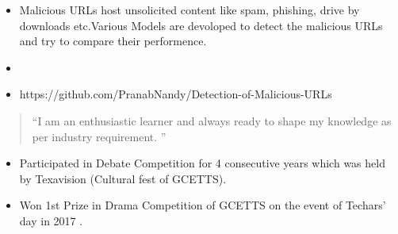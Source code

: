 \documentclass[10pt,a4paper,ragged2e,withhyper]{altacv}
\begin{document}
\begin{paracol}{2}
\divider

\begin{itemize}
	\item Malicious URLs host unsolicited
	content like spam, phishing, drive by downloads etc.Various Models are devoloped to detect the malicious URLs and try to compare their performence. 
	\item
	\item https://github.com/PranabNandy/Detection-of-Malicious-URLs
\end{itemize}



\switchcolumn

\begin{quote}
``I am an enthusiastic learner and always ready to shape my knowledge as per industry requirement. ''
\end{quote}



\divider


\divider




\divider



\begin{itemize}
\item Participated in Debate Competition for 4 consecutive years which was held by Texavision (Cultural fest of GCETTS).      

\item Won 1st Prize in Drama Competition of GCETTS on the event of Techars' day in 2017 . 
\end{itemize}




\end{paracol}
\end{document}
